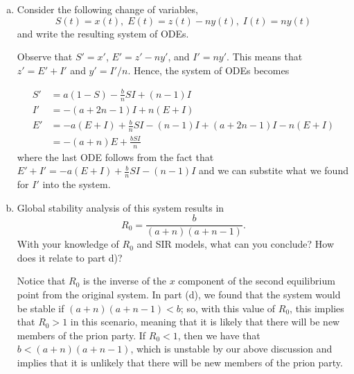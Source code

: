 \documentclass[11pt]{amsart}
\begin{document}
\begin{enumerate}[a)]
On the other hand, if it is positive, then we need to show that the real part is negative. To do this, we need to show that the square root portion of the eigenvalue is smaller in magnitude than the part that is outside of the square root. If we assume that $(a+n-1)(a+n)<b$, we can set b=(a+n-1)(a+n) + epsilon. Substituting this in, we can show that the eigenvalues have to be negative (for example, by setting some maximum value). Therefore, since the eigenvalues are always negative when $(a+n)(a+n-1)<b$, we conclude that this condition on the constants will lead to a local stable point.\\

{\it For this part, I will be looking for more of the rationale.\\}

\item Consider the following change of variables,
$$ S(t) = x(t),\; E(t) = z(t) - n y(t),\; I(t) = n y(t) $$
and write the resulting system of ODEs.

 Observe that $S' = x'$, $E' = z'-ny'$, and $I' = ny'$. This means that $z' = E'+I'$ and $y' = I'/n$. Hence, the system of ODEs becomes 

\begin{align*} S' &= a(1-S) - \frac{b}{n} S I + (n-1)I \\ I' &= -(a+2n-1)I + n(E+I) \\ E' &= -a(E+I) + \frac{b}{n} SI - (n-1)I + (a+2n-1)I - n(E+I) \\ &= -(a+n) E+\frac{b SI}{n} 
\end{align*} where the last ODE follows from the fact that $E' + I' = -a(E+I) + \frac{b}{n} SI - (n-1) I$ and we can substite what we found for $I'$ into the system.

\item Global stability analysis of this system results in
$$ R_0 = \frac{b}{(a+n)(a+n-1)}. $$
With your knowledge of $R_0$ and SIR models, what can you conclude? How does it relate to part d)?

 Notice that $R_0$ is the inverse of the $x$ component of the second equilibrium point from the original system. In part (d), we found that the system would be stable if $(a+n)(a+n-1)<b$; so, with this value of $R_0$, this implies that $R_0>1$ in this scenario, meaning that it is likely that there will be new members of the prion party.
If $R_0<1$, then we have that $b < (a+n)(a+n-1)$, which is unstable by our above discussion and implies that it is unlikely that there will be new members of the prion party.
\end{enumerate}
\end{document}
